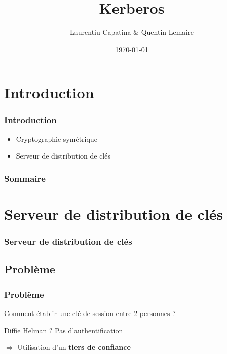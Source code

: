 \documentclass[svgnames]{beamer}
\title{Kerberos}
\author{Laurentiu Capatina \& Quentin Lemaire}
\date{\today}
\begin{document}
  
\maketitle %

\section*{Introduction}

\begin{frame}
  \frametitle{Introduction}
  \begin{itemize}
    \item Cryptographie symétrique
    \item Serveur de distribution de clés
  \end{itemize}
\end{frame}

\begin{frame}
  \frametitle{Sommaire}
  \tableofcontents
\end{frame}


\section{Serveur de distribution de clés}

\begin{frame}
  \frametitle{Serveur de distribution de clés}
\end{frame}


\subsection{Problème}
\begin{frame}
  \frametitle{Problème}
  
  \begin{center}
    Comment établir une clé de session entre 2 personnes ? %
  \end{center}
  
  \pause
  
  \begin{alertblock}{Diffie Helman ?}
    Pas d'authentification
  \end{alertblock}
  
  \pause
  
  $\Rightarrow$ Utilisation d'un \textbf{tiers de confiance}
  
%     
\end{frame}
\end{document}
